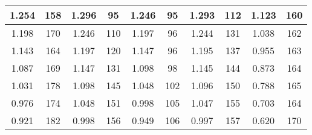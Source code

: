 \begin{table}[H]
{\begin{tabular}{|cc|cc|cc|cc|cc|}
		\multicolumn{1}{|c|}{1.254}          & 158                                & \multicolumn{1}{c|}{1.296}          & 95                                & \multicolumn{1}{c|}{1.246}           & 95                    & \multicolumn{1}{c|}{1.293}      & 112                   & \multicolumn{1}{c|}{1.123}      & 160                   \\ \hline
		\multicolumn{1}{|c|}{1.198}          & 170                                & \multicolumn{1}{c|}{1.246}          & 110                               & \multicolumn{1}{c|}{1.197}           & 96                    & \multicolumn{1}{c|}{1.244}      & 131                   & \multicolumn{1}{c|}{1.038}      & 162                   \\ \hline
		\multicolumn{1}{|c|}{1.143}          & 164                                & \multicolumn{1}{c|}{1.197}          & 120                               & \multicolumn{1}{c|}{1.147}           & 96                    & \multicolumn{1}{c|}{1.195}      & 137                   & \multicolumn{1}{c|}{0.955}      & 163                   \\ \hline
		\multicolumn{1}{|c|}{1.087}          & 169                                & \multicolumn{1}{c|}{1.147}          & 131                               & \multicolumn{1}{c|}{1.098}           & 98                    & \multicolumn{1}{c|}{1.145}      & 144                   & \multicolumn{1}{c|}{0.873}      & 164                   \\ \hline
		\multicolumn{1}{|c|}{1.031}          & 178                                & \multicolumn{1}{c|}{1.098}          & 145                               & \multicolumn{1}{c|}{1.048}           & 102                   & \multicolumn{1}{c|}{1.096}      & 150                   & \multicolumn{1}{c|}{0.788}      & 165                   \\ \hline
		\multicolumn{1}{|c|}{0.976}          & 174                                & \multicolumn{1}{c|}{1.048}          & 151                               & \multicolumn{1}{c|}{0.998}           & 105                   & \multicolumn{1}{c|}{1.047}      & 155                   & \multicolumn{1}{c|}{0.703}      & 164                   \\ \hline
		\multicolumn{1}{|c|}{0.921}          & 182                                & \multicolumn{1}{c|}{0.998}          & 156                               & \multicolumn{1}{c|}{0.949}           & 106                   & \multicolumn{1}{c|}{0.997}      & 157                   & \multicolumn{1}{c|}{0.620}      & 170                   \\ \hline

\end{tabular}}
\end{table}
